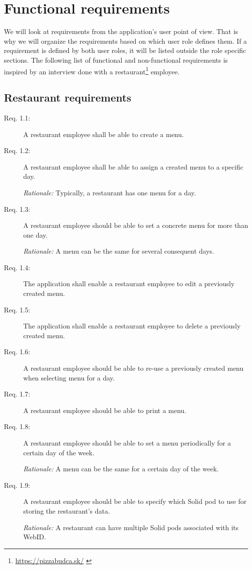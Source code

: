 \section{Functional requirements}
We will look at requirements from the application's user point of view.
That is why we will organize the requirements based on which user role defines them.
If a requirement is defined by both user roles, it will be listed outside the role specific sections.
The following list of functional and non-functional requirements is inspired by an interview done with a restaurant\footnote{\url{https://pizzabudca.sk/}  \label{fnlabel}} employee.

\subsection{Restaurant requirements}
\begin{description}
    \item [Req. 1.1:] A restaurant employee shall be able to create a menu.
    \item [Req. 1.2:] A restaurant employee shall be able to assign a created menu to a specific day.

    \emph{Rationale:} Typically, a restaurant has one menu for a day.
    \item[Req. 1.3:] A restaurant employee should be able to set a concrete menu for more than one day.

    \emph{Rationale:} A menu can be the same for several consequent days.
    \item [Req. 1.4:] The application shall enable a restaurant employee to edit a previously created menu.
    \item [Req. 1.5:] The application shall enable a restaurant employee to delete a previously created menu.
    \item [Req. 1.6:] A restaurant employee should be able to re-use a previously created menu when selecting menu for a day.
    \item [Req. 1.7:] A restaurant employee should be able to print a menu.
    \item [Req. 1.8:] A restaurant employee should be able to set a menu periodically for a certain day of the week.

    \emph{Rationale:} A menu can be the same for a certain day of the week. 
    \item [Req. 1.9:] A restaurant employee should be able to specify which Solid pod to use for storing the restaurant's data.

    \emph{Rationale:} A restaurant can have multiple Solid pods associated with its WebID.
\end{description}

